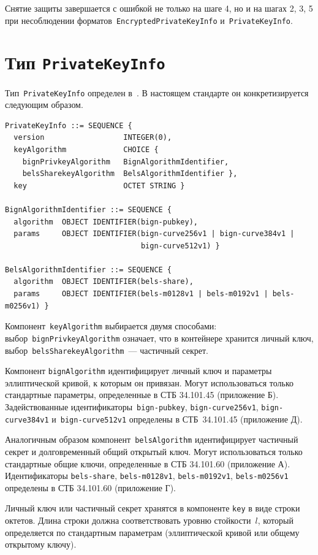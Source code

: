 Снятие защиты завершается с ошибкой не только на шаге 4, но и на 
шагах 2, 3, 5 при несоблюдении форматов~\texttt{EncryptedPrivateKeyInfo} 
и~\texttt{PrivateKeyInfo}. 

\section{Тип \texttt{PrivateKeyInfo}}\label{CONT.PT}

Тип~\texttt{PrivateKeyInfo} определен в~\cite{PKCS8}.
В настоящем стандарте он конкретизируется следующим образом.

\begin{verbatim}
PrivateKeyInfo ::= SEQUENCE {
  version                  INTEGER(0),
  keyAlgorithm             CHOICE {
    bignPrivkeyAlgorithm   BignAlgorithmIdentifier,
    belsSharekeyAlgorithm  BelsAlgorithmIdentifier },
  key                      OCTET STRING }

BignAlgorithmIdentifier ::= SEQUENCE {
  algorithm  OBJECT IDENTIFIER(bign-pubkey),
  params     OBJECT IDENTIFIER(bign-curve256v1 | bign-curve384v1 | 
                               bign-curve512v1) }

BelsAlgorithmIdentifier ::= SEQUENCE {
  algorithm  OBJECT IDENTIFIER(bels-share),
  params     OBJECT IDENTIFIER(bels-m0128v1 | bels-m0192v1 | bels-m0256v1) }
\end{verbatim}

Компонент~\texttt{keyAlgorithm} выбирается двумя способами:
выбор~\texttt{bignPrivkeyAlgorithm} означает, что в контейнере хранится личный 
ключ, выбор~\texttt{belsSharekeyAlgorithm}~--- частичный секрет. 

Компонент \texttt{bignAlgorithm} идентифицирует личный ключ и параметры 
эллиптической кривой, к которым он привязан. Могут использоваться
только стандартные параметры, определенные в СТБ 34.101.45 (приложение Б). 
%
Задействованные идентификаторы~\texttt{bign-pubkey}, 
\texttt{bign-curve256v1}, \texttt{bign-curve384v1} 
и~\texttt{bign-curve512v1} определены в СТБ~34.101.45 (приложение Д).

Аналогичным образом компонент~\texttt{belsAlgorithm} идентифицирует 
частичный секрет и долговременный общий открытый ключ. 
Могут использоваться только стандартные общие ключи, 
определенные в СТБ 34.101.60 (приложение А). 
Идентификаторы \texttt{bels-share}, \texttt{bels-m0128v1}, 
\texttt{bels-m0192v1}, \texttt{bels-m0256v1} определены в СТБ 34.101.60 
(приложение Г).

Личный ключ или частичный секрет хранятся в компоненте \texttt{key}
в виде строки октетов. Длина строки должна соответствовать уровню
стойкости~$l$, который определяется по стандартным параметрам
(эллиптической кривой или общему открытому ключу).


